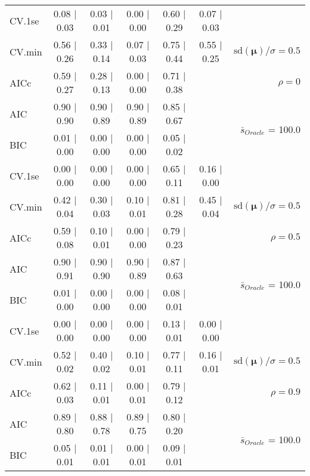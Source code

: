 \begin{table}
\begin{center}
\begin{tabular}{l*{5}{c}|r}
 \hline 
CV.1se & 0.08 $\mid$ 0.03 & 0.03 $\mid$ 0.01 & 0.00 $\mid$ 0.00 & 0.60 $\mid$ 0.29 & 0.07 $\mid$ 0.03 & \\
CV.min & 0.56 $\mid$ 0.26 & 0.33 $\mid$ 0.14 & 0.07 $\mid$ 0.03 & 0.75 $\mid$ 0.44 & 0.55 $\mid$ 0.25 &  $\mathrm{sd}(\mathbf{\mu})/\sigma=0.5$ \\
AICc & 0.59 $\mid$ 0.27 & 0.28 $\mid$ 0.13 & 0.00 $\mid$ 0.00 & 0.71 $\mid$ 0.38 & & $\rho=0$ \\
AIC & 0.90 $\mid$ 0.90 & 0.90 $\mid$ 0.89 & 0.90 $\mid$ 0.89 & 0.85 $\mid$ 0.67 & &  \multirow{2}{*}{$\bar{s}_{Oracle}$ = 100.0} \\
BIC & 0.01 $\mid$ 0.00 & 0.00 $\mid$ 0.00 & 0.00 $\mid$ 0.00 & 0.05 $\mid$ 0.02 & &  \\
 \hline 
CV.1se & 0.00 $\mid$ 0.00 & 0.00 $\mid$ 0.00 & 0.00 $\mid$ 0.00 & 0.65 $\mid$ 0.11 & 0.16 $\mid$ 0.00 & \\
CV.min & 0.42 $\mid$ 0.04 & 0.30 $\mid$ 0.03 & 0.10 $\mid$ 0.01 & 0.81 $\mid$ 0.28 & 0.45 $\mid$ 0.04 &  $\mathrm{sd}(\mathbf{\mu})/\sigma=0.5$ \\
AICc & 0.59 $\mid$ 0.08 & 0.10 $\mid$ 0.01 & 0.00 $\mid$ 0.00 & 0.79 $\mid$ 0.23 & & $\rho=0.5$ \\
AIC & 0.90 $\mid$ 0.91 & 0.90 $\mid$ 0.90 & 0.90 $\mid$ 0.89 & 0.87 $\mid$ 0.63 & &  \multirow{2}{*}{$\bar{s}_{Oracle}$ = 100.0} \\
BIC & 0.01 $\mid$ 0.00 & 0.00 $\mid$ 0.00 & 0.00 $\mid$ 0.00 & 0.08 $\mid$ 0.01 & &  \\
 \hline 
CV.1se & 0.00 $\mid$ 0.00 & 0.00 $\mid$ 0.00 & 0.00 $\mid$ 0.00 & 0.13 $\mid$ 0.01 & 0.00 $\mid$ 0.00 & \\
CV.min & 0.52 $\mid$ 0.02 & 0.40 $\mid$ 0.02 & 0.10 $\mid$ 0.01 & 0.77 $\mid$ 0.11 & 0.16 $\mid$ 0.01 &  $\mathrm{sd}(\mathbf{\mu})/\sigma=0.5$ \\
AICc & 0.62 $\mid$ 0.03 & 0.11 $\mid$ 0.01 & 0.00 $\mid$ 0.01 & 0.79 $\mid$ 0.12 & & $\rho=0.9$ \\
AIC & 0.89 $\mid$ 0.80 & 0.88 $\mid$ 0.78 & 0.89 $\mid$ 0.75 & 0.80 $\mid$ 0.20 & &  \multirow{2}{*}{$\bar{s}_{Oracle}$ = 100.0} \\
BIC & 0.05 $\mid$ 0.01 & 0.01 $\mid$ 0.01 & 0.00 $\mid$ 0.01 & 0.09 $\mid$ 0.01 & &  \\
 \hline 
\end{tabular}
\end{center}
\vspace{-1cm}
\end{table}




